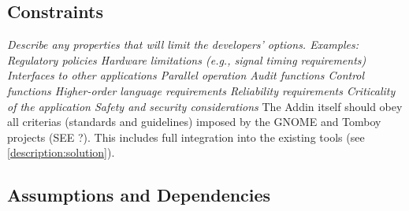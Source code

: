 \subsection{Constraints}
\label{description:constraints}
\textit{Describe any properties that will limit the developers’ options. Examples:
Regulatory policies
Hardware limitations (e.g., signal timing requirements)
Interfaces to other applications
Parallel operation
Audit functions
Control functions
Higher-order language requirements
Reliability requirements
Criticality of the application
Safety and security considerations}
The Addin itself should obey all criterias (standards and guidelines) imposed by the GNOME and Tomboy projects (SEE ?).
This includes full integration into the existing tools (see \ref{description:solution}).


\subsection{Assumptions and Dependencies}
\label{description:assumptions}

